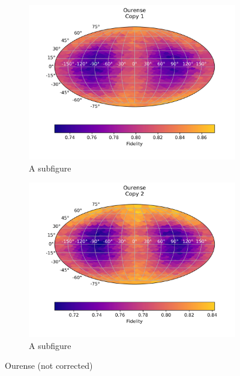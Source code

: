 \begin{figure}[H]
    \centering
    \begin{subfigure}{.5\textwidth}
      \centering
      \includegraphics[width=\textwidth]{Figures/PhaseCovariant/IBM/FullSphere/results_ourense.txt_copy1.png}
      \caption{A subfigure}
      \label{fig:pc_ourense_sphere_1}
    \end{subfigure}%
    \begin{subfigure}{.5\textwidth}
      \centering
      \includegraphics[width=\textwidth]{Figures/PhaseCovariant/IBM/FullSphere/results_ourense.txt_copy2.png}
      \caption{A subfigure}
      \label{fig:pc_ourense_sphere_2}
    \end{subfigure}
    \caption{Ourense (not corrected)}
    \label{fig:pc_ourense_sphere}
\end{figure}

